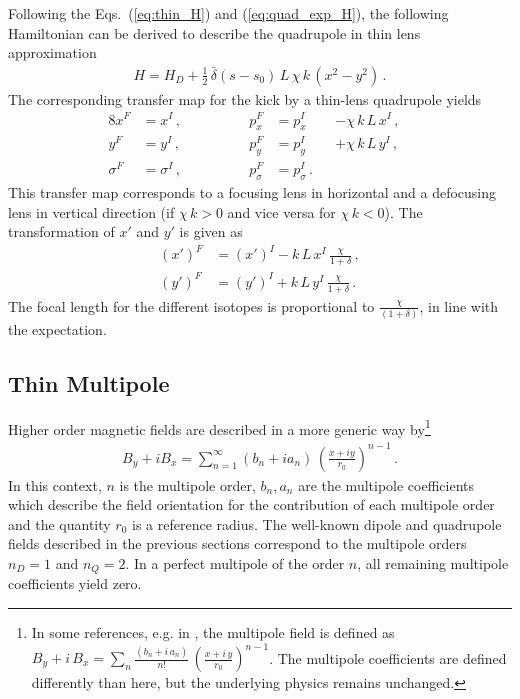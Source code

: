Following the Eqs.~(\ref{eq:thin_H}) and (\ref{eq:quad_exp_H}), the following Hamiltonian can be derived to describe the quadrupole in thin lens approximation
%
\begin{align}
  H = H_D + \frac{1}{2} \, \bar{\delta}(s-s_0) \, L \, \chi \, k \, (x^2-y^2) \, .
\end{align}
The corresponding transfer map for the kick by a thin-lens quadrupole yields
\begin{alignat}{8}
x^F &= x^I \, ,  \quad \quad \quad \quad &p_x^F &=  p_x^I &&-  \chi \, k \,  L \, x^I \, ,  \label{quad1}\\ 
y^F &= y^I \, ,  \quad \quad \quad \quad &p_y^F &=  p_y^I &&+  \chi \, k\,  L \, y^I \, , \label{quad2}\\
\sigma^F &= \sigma^I \, ,  \quad \quad \quad \quad &p_\sigma^F &=  p_\sigma^I \,. &&  &
\end{alignat}
This transfer map corresponds to a focusing lens  in horizontal and a defocusing lens in vertical direction (if $\chi \, k>0$ and vice versa for $\chi \, k <0$). The transformation of $x'$ and $y'$ is given as
\begin{align}
 (x')^F &= (x')^I - k \, L \, x^I \, \frac{\chi}{1+\delta} \, , \\
 (y')^F &= (y')^I + k \, L \, y^I \, \frac{\chi}{1+\delta} \, .
\end{align}
The focal length for the different isotopes is proportional to $\frac{\chi}{(1+\delta)}$, in line with the expectation.

\subsection{Thin Multipole} \label{chap:multipole}
Higher order magnetic fields are described in a more generic way by\footnote{In some references, e.g. in \cite{wiedemann1999particle}, the multipole field is defined as $B_y+i\,B_x = \sum_{n} \frac{(b_n+i \, a_n)}{n!} \, \left( \frac{x+i \, y}{r_0} \right)^{n-1}$. The multipole coefficients are defined differently than here, but the underlying physics remains unchanged.}~\cite{wolski2014beam}
%
\begin{align}
  B_y + i B_x = \sum_{n=1}^{\infty} (b_n + i a_n) \, \left( \frac{x+iy}{r_0} \right)^{n-1} \, . \label{eq:multiB}
\end{align}
%
In this context, $n$ is the multipole order, $b_n,a_n$ are the multipole coefficients which describe the field orientation for the contribution of each multipole order~\cite{wolski2014beam} and the quantity $r_0$ is a reference radius. The well-known dipole and quadrupole fields described in the previous sections correspond to the multipole orders $n_D=1$ and $n_Q=2$. In a perfect multipole of the order $n$, all remaining multipole coefficients yield zero.

